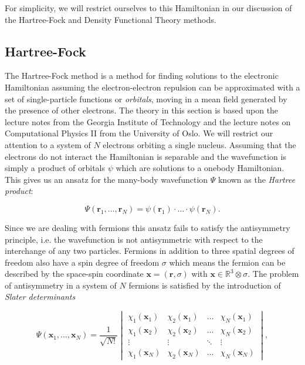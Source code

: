For simplicity, we will restrict ourselves to this Hamiltonian
in our discussion of the Hartree-Fock and Density Functional Theory
methods.

\subsection{Hartree-Fock}
The Hartree-Fock method is a method for finding
solutions to the electronic Hamiltonian assuming
the electron-electron repulsion can be approximated
with a set of single-particle functions or \textit{orbitals},
moving in a mean field generated by the presence of other electrons.
The theory in this section is based upon the \parencite[Sherrill]
{sherrill2000} lecture notes from the Georgia Institute of Technology
and the lecture notes
on Computational Physics II \parencite[Hjorth-Jensen]
{hjensen2019} from the University of Oslo.
We will restrict our attention to a system of $N$ electrons
orbiting a single nucleus.
Assuming that the electrons do not interact
the Hamiltonian is separable and the wavefunction
is simply a product of orbitals $\psi$
which are solutions to a onebody Hamiltonian.
This gives us an ansatz for the many-body wavefunction $\Psi$
known as the \textit{Hartree product}:

\begin{equation}
 \Psi(\bm{r}_1,\dots,\bm{r}_N) = \psi(\bm{r}_1) \cdot \dots
    \cdot \psi(\bm{r}_N) . 
\end{equation}

Since we are dealing with fermions this ansatz fails to satisfy
the antisymmetry principle, i.e. the wavefunction
is not antisymmetric with respect to the interchange of any two
particles. Fermions in addition to three spatial degrees of freedom
also have a spin degree of freedom $\sigma$
which means the fermion can be described
by the space-spin coordinate $\bm{x} = (\bm{r}, \sigma)$
with $\bm{x} \in \mathbb{R}^3 \otimes \sigma$.
The problem of antisymmetry in a system of $N$ fermions
is satisfied by the introduction of \textit{Slater determinants}

\begin{equation}
\Psi(\bm{x}_1,\dots,\bm{x}_N)
= \frac{1}{\sqrt{N!}}
\begin{vmatrix}
    \chi_{1}(\bm{x}_1) & \chi_{2}(\bm{x}_1)
    & \dots & \chi_{N}(\bm{x}_1) \\
    \chi_{1}(\bm{x}_2)  & \chi_{2}(\bm{x}_2)
    & \dots & \chi_{N}(\bm{x}_2) \\
    \vdots & \vdots & \ddots & \vdots \\
    \chi_{1}(\bm{x}_N) & \chi_{2}(\bm{x}_N)
    & \dots & \chi_{N}(\bm{x}_N)
\end{vmatrix} ,
\end{equation}

